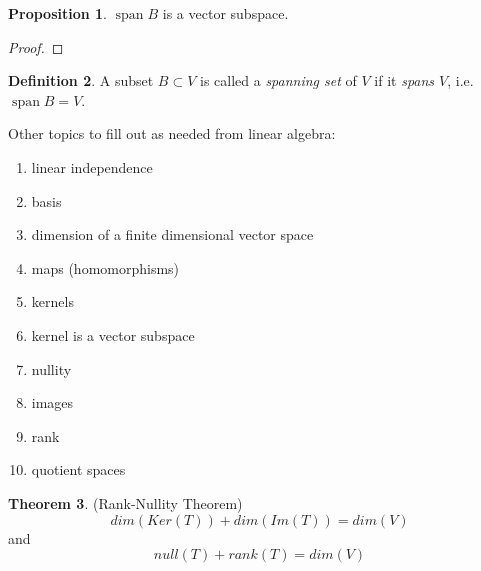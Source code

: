 \documentclass[12pt]{article}
\theoremstyle{definition}
\newtheorem{thm}{Theorem}[section]
\newtheorem{defn}[thm]{Definition}
\newtheorem{prop}[thm]{Proposition}
\DeclareMathOperator{\spann}{span}
\begin{document}
\begin{prop}\label{prop0}
$\spann{B}$ is a vector subspace.

\begin{proof}

\end{proof}
\end{prop}

\begin{defn}\label{defn1-2}
A subset $B \subset V$ is called a \emph{spanning set} of $V$ if it \emph{spans $V$}, i.e. $\spann{B} = V$. 
\end{defn}

Other topics to fill out as needed from linear algebra:

\begin{enumerate}
\item linear independence
\item basis
\item dimension of a finite dimensional vector space
\item maps (homomorphisms)
\item kernels
\item kernel is a vector subspace
\item nullity
\item images
\item rank
\item quotient spaces
\end{enumerate}

\begin{thm}{(Rank-Nullity Theorem)}\label{thm0}
$$dim{(Ker ({T}))} + dim{(Im ({T}))} = dim{(V)}$$ and $$null {(T)} + rank (T) = dim{(V)}$$
\end{thm}
\end{document}
